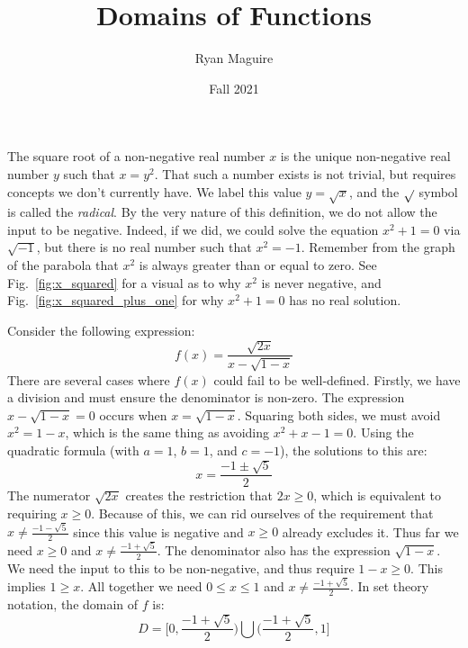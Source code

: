 \documentclass{article}
\title{Domains of Functions}
\author{Ryan Maguire}
\date{Fall 2021}
\begin{document}
    \maketitle
    The square root of a non-negative real number $x$ is the unique
    non-negative real number $y$ such that $x=y^{2}$. That such a number exists
    is not trivial, but requires concepts we don't currently have. We
    label this value $y=\sqrt{x}$, and the $\sqrt{\empty}$ symbol is called the
    \textit{radical}. By the very nature of this definition, we do not allow
    the input to be negative. Indeed, if we did, we could solve the equation
    $x^{2}+1=0$ via $\sqrt{-1}$, but there is no real number such that
    $x^{2}=-1$. Remember from the graph of the parabola that $x^{2}$ is
    always greater than or equal to zero. See
    Fig.~\ref{fig:x_squared} for a visual as to why $x^{2}$ is never negative,
    and Fig.~\ref{fig:x_squared_plus_one} for why $x^{2}+1=0$ has no real
    solution.
    \par\hfill\par
    Consider the following expression:
    \begin{equation}
        f(x)=\frac{\sqrt{2x}}{x-\sqrt{1-x}}
    \end{equation}
    There are several cases where $f(x)$ could fail to be well-defined. Firstly,
    we have a division and must ensure the denominator is non-zero. The
    expression $x-\sqrt{1-x}=0$ occurs when $x=\sqrt{1-x}$. Squaring both
    sides, we must avoid $x^{2}=1-x$, which is the same thing as avoiding
    $x^{2}+x-1=0$. Using the quadratic formula (with $a=1$, $b=1$, and
    $c=-1$), the solutions to this are:
    \begin{equation}
        x=\frac{-1\pm\sqrt{5}}{2}
    \end{equation}
    The numerator $\sqrt{2x}$ creates the restriction that $2x\geq{0}$, which
    is equivalent to requiring $x\geq{0}$. Because of this, we can rid ourselves
    of the requirement that $x\ne\frac{-1-\sqrt{5}}{2}$ since this value is
    negative and $x\geq{0}$ already excludes it. Thus far we need
    $x\geq{0}$ and $x\ne\frac{-1+\sqrt{5}}{2}$. The denominator also has the
    expression $\sqrt{1-x}$. We need the input to this to be non-negative, and
    thus require $1-x\geq{0}$. This implies $1\geq{x}$. All together we need
    $0\leq{x}\leq{1}$ and $x\ne\frac{-1+\sqrt{5}}{2}$. In set theory notation,
    the domain of $f$ is:
    \begin{equation}
        D=\Big[0,\frac{-1+\sqrt{5}}{2}\Big)\bigcup
        \Big(\frac{-1+\sqrt{5}}{2},1\Big]
    \end{equation}
\end{document}
